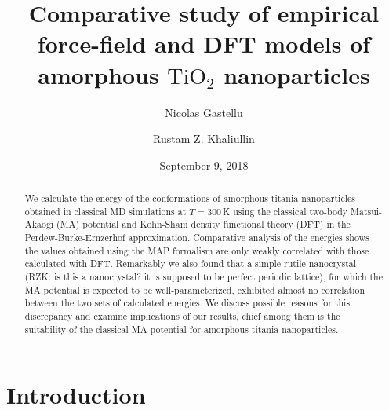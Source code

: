 \documentclass[aps,prb,twocolumn,amsmath,amssymb,superscriptaddress,longbibliography]{revtex4-1}
\begin{document}
\title{
Comparative study of empirical force-field and DFT models of amorphous $\text{TiO}_2$ nanoparticles
}

\author{Nicolas Gastellu}
\author{Rustam Z. Khaliullin}

\date{September 9, 2018}

\begin{abstract}

We calculate the energy of the conformations of amorphous titania nanoparticles obtained in classical MD simulations at $T=300\,$K using the classical two-body Matsui-Akaogi (MA) potential and Kohn-Sham density functional theory (DFT) in the Perdew-Burke-Ernzerhof approximation. 
Comparative analysis of the energies shows the values obtained using the MAP formalism are only weakly correlated with those calculated with DFT. 
Remarkably we also found that a simple rutile nanocrystal (RZK: is this a nanocrystal? it is supposed to be perfect periodic lattice), for which the MA potential is expected to be well-parameterized, exhibited almost no correlation between the two sets of calculated energies. 
We discuss possible reasons for this discrepancy and examine implications of our results, chief among them is the suitability of the classical MA potential for amorphous titania nanoparticles.


\end{abstract}

\maketitle
 

\section*{Introduction} 
\end{document}
